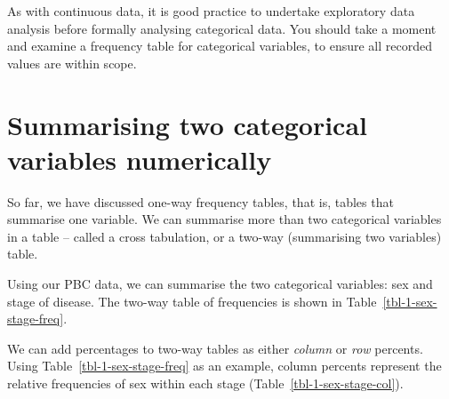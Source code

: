 \documentclass[
  a4paper,
]{memoir}
\newcounter{none} %
\begin{document}
As with continuous data, it is good practice to undertake exploratory
data analysis before formally analysing categorical data. You should
take a moment and examine a frequency table for categorical variables,
to ensure all recorded values are within scope.

\section{Summarising two categorical variables
numerically}\label{summarising-two-categorical-variables-numerically}

So far, we have discussed one-way frequency tables, that is, tables that
summarise one variable. We can summarise more than two categorical
variables in a table -- called a cross tabulation, or a two-way
(summarising two variables) table.

Using our PBC data, we can summarise the two categorical variables: sex
and stage of disease. The two-way table of frequencies is shown in
Table~\ref{tbl-1-sex-stage-freq}.

\begin{table}[h]

\caption{\label{tbl-1-sex-stage-freq}Frequency of participants by sex
and stage of disease*}


\end{table}%

We can add percentages to two-way tables as either \emph{column} or
\emph{row} percents. Using Table~\ref{tbl-1-sex-stage-freq} as an
example, column percents represent the relative frequencies of sex
within each stage (Table~\ref{tbl-1-sex-stage-col}).
\end{document}
